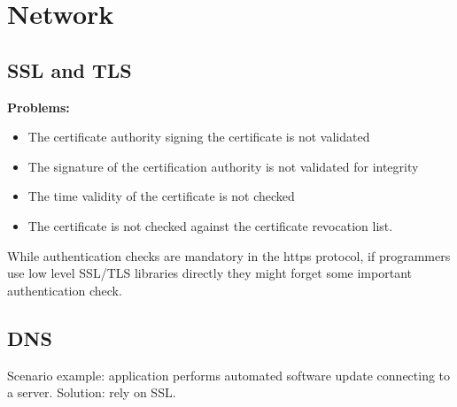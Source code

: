 \documentclass[10pt,a4paper]{article}
\begin{document}
\section{Network}
\subsection{SSL and TLS}
\textbf{Problems:}
\begin{itemize}
\item The certificate authority signing the certificate is not validated
\item The signature of the certification authority is not validated for integrity
\item The time validity of the certificate is not checked
\item The certificate is not checked against the certificate revocation list.
\end{itemize}
While authentication checks are mandatory in the https protocol, if programmers use low level SSL/TLS libraries directly they might forget some important authentication check.
\subsection{DNS}
Scenario example: application performs automated software update connecting to a server. Solution: rely on SSL.
\end{document}
